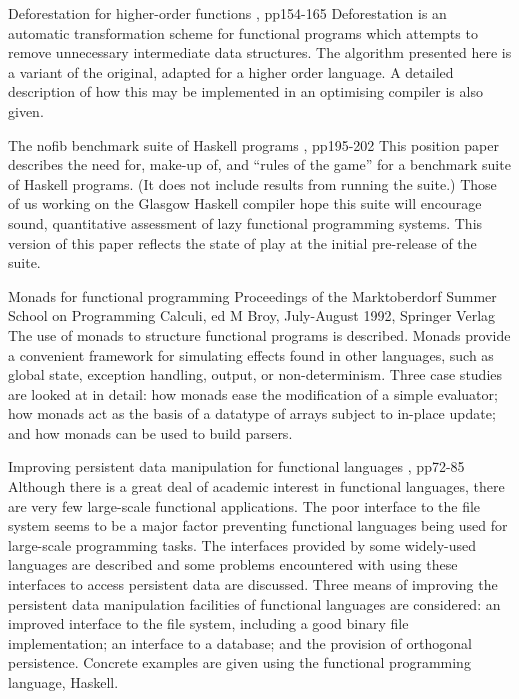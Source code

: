 {Deforestation for higher-order functions}
{\GlasgowNinetyTwo{}, pp154-165}
{Deforestation is an automatic transformation scheme for functional
programs which attempts to remove unnecessary intermediate data
structures. The algorithm presented here is a variant of the original,
adapted for a higher order language. A detailed description of how
this may be implemented in an optimising compiler is also given.
}

{The nofib benchmark suite of Haskell programs}
{\GlasgowNinetyTwo{}, pp195-202}
{This position paper describes the need for, make-up of, and
``rules of the game'' for a benchmark suite of Haskell programs.  (It
does not include results from running the suite.) Those of us working
on the Glasgow Haskell compiler hope this suite will encourage sound,
quantitative assessment of lazy functional programming systems.  This
version of this paper reflects the state of play at the initial
pre-release of the suite.
}

{Monads for functional programming}
{Proceedings of the Marktoberdorf Summer School on Programming Calculi, 
ed M Broy, July-August 1992, Springer Verlag}
{The use of monads to structure functional programs is
described.  Monads provide a convenient framework for simulating
effects found in other languages, such as global state, exception
handling, output, or non-determinism.  Three case studies are looked at
in detail: how monads ease the modification of a simple evaluator;
how monads act as the basis of a datatype of arrays subject to in-place
update; and how monads can be used to build parsers.
}

{Improving persistent data manipulation for functional languages}
{\GlasgowNinetyTwo{}, pp72-85}
{Although there is a great deal of academic interest in
functional languages, there are very few large-scale functional
applications. The poor interface to the file system seems to be a
major factor preventing functional languages being used for
large-scale programming tasks. The interfaces provided by some
widely-used languages are described and some problems encountered with
using these interfaces to access persistent data are discussed. Three
means of improving the persistent data manipulation facilities of
functional languages are considered: an improved interface to the file
system, including a good binary file implementation; an interface to a
database; and the provision of orthogonal persistence.  Concrete
examples are given using the functional programming language, Haskell.
}

